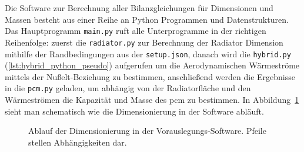 Die Software zur Berechnung aller Bilanzgleichungen für Dimensionen und Massen besteht aus einer Reihe an Python Programmen und Datenstrukturen.
Das Hauptprogramm \texttt{main.py} ruft alle Unterprogramme in der richtigen Reihenfolge: zuerst die \texttt{radiator.py} zur Berechnung
der Radiator Dimension mithilfe der Randbedingungen aus der \texttt{setup.json}, danach wird die \texttt{hybrid.py} (\ref{lst:hybrid_python_pseudo}) aufgerufen um die Aerodynamischen Wärmeströme
mittels der Nußelt-Beziehung zu bestimmen, anschließend werden die Ergebnisse in die \texttt{pcm.py} geladen, um abhängig von der Radiatorfläche
und den Wärmeströmen die Kapazität und Masse des \ac{pcm} zu bestimmen.
In Abbildung~\ref{fig:dimensionierung_ablauf} sieht man schematisch wie die Dimensionierung in der Software abläuft.

\begin{figure}
  \centering
  \caption{Ablauf der Dimensionierung in der Vorauslegungs-Software. Pfeile stellen Abhängigkeiten dar.}\label{fig:dimensionierung_ablauf}
\end{figure}

